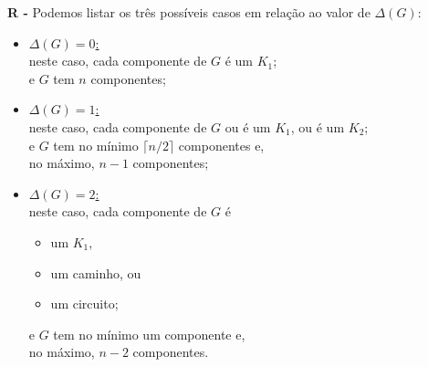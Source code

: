 \documentclass[12pt,a4paper,oneside]{article}
\begin{document}
\begin{enumerate}
	{\color{blue} {\bf R -} Podemos listar os três possíveis casos em relação ao valor de $\Delta(G)$:
		\begin{itemize}
			\item \underline{$\Delta(G) = 0$:} 
			\\neste caso, cada componente de $G$ é um $K_1$; 
			\\e $G$ tem $n$ componentes;
			\item \underline{$\Delta(G) = 1$:} 
			\\neste caso, cada componente de $G$ ou é um $K_1$, ou é um $K_2$; 
			\\e $G$ tem no mínimo $\lceil n/2 \rceil$ componentes e, 
			\\no máximo, $n -1$ componentes;
			\item \underline{$\Delta(G) = 2$:} 
			\\neste caso, cada componente de $G$ é 
				\begin{itemize}
					\item um $K_1$,
					\item um caminho, ou
					\item um circuito;
				\end{itemize}
			e $G$ tem no mínimo um componente e, 
			\\no máximo, $n - 2$ componentes.
		\end{itemize}
	
	}
	
	\end{enumerate}
\end{document}
